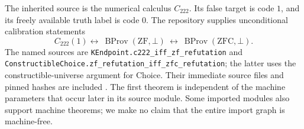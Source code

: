 \documentclass[11pt,letterpaper]{article}
\theoremstyle{definition}\newtheorem{definition}[theorem]{Definition}
\theoremstyle{remark}\newtheorem{remark}[theorem]{Remark}
\newcommand{\ZFC}{\mathrm{ZFC}}
\newcommand{\ZF}{\mathrm{ZF}}
\newcommand{\file}[1]{\texttt{\nolinkurl{#1}}}
\begin{document}
The inherited source is the numerical calculus $C_{222}$. Its false target
is code $1$, and its freely available truth label is code $0$. The
repository supplies unconditional calibration statements
\begin{equation}\label{eq:calibration}
 C_{222}(1) \longleftrightarrow\
 \operatorname{BProv}(\ZF,\bot)
 \ \longleftrightarrow\
 \operatorname{BProv}(\ZFC,\bot).
\end{equation}
The named sources are \file{KEndpoint.c222_iff_zf_refutation} and
\file{ConstructibleChoice.zf_refutation_iff_zfc_refutation}; the latter
uses the constructible-universe argument for Choice. Their immediate
source files and pinned hashes are included \cite{calibration,choice}.
The first theorem is independent of the machine parameters that occur
later in its source module. Some imported modules also support machine
theorems; we make no claim that the entire import graph is machine-free.
\end{document}
